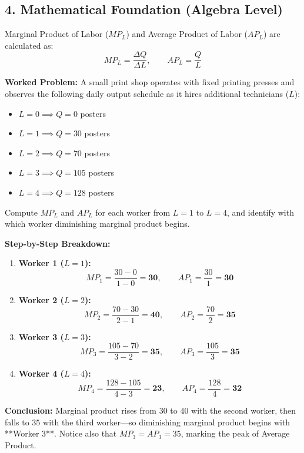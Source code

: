 \documentclass[11pt,letterpaper]{article}
\begin{document}
\subsection*{4. Mathematical Foundation (Algebra Level)}
Marginal Product of Labor ($MP_L$) and Average Product of Labor ($AP_L$) are calculated as:
\begin{equation}
MP_L = \frac{\Delta Q}{\Delta L}, \qquad AP_L = \frac{Q}{L}
\end{equation}

\noindent\textbf{Worked Problem:}
A small print shop operates with fixed printing presses and observes the following daily output schedule as it hires additional technicians ($L$):
\begin{itemize}
    \item $L = 0 \implies Q = 0$ posters
    \item $L = 1 \implies Q = 30$ posters
    \item $L = 2 \implies Q = 70$ posters
    \item $L = 3 \implies Q = 105$ posters
    \item $L = 4 \implies Q = 128$ posters
\end{itemize}
Compute $MP_L$ and $AP_L$ for each worker from $L = 1$ to $L = 4$, and identify with which worker diminishing marginal product begins.

\noindent\textbf{Step-by-Step Breakdown:}
\begin{enumerate}
    \item \textbf{Worker 1 ($L = 1$):}
    \[
    MP_1 = \frac{30 - 0}{1 - 0} = \mathbf{30}, \qquad AP_1 = \frac{30}{1} = \mathbf{30}
    \]

    \item \textbf{Worker 2 ($L = 2$):}
    \[
    MP_2 = \frac{70 - 30}{2 - 1} = \mathbf{40}, \qquad AP_2 = \frac{70}{2} = \mathbf{35}
    \]

    \item \textbf{Worker 3 ($L = 3$):}
    \[
    MP_3 = \frac{105 - 70}{3 - 2} = \mathbf{35}, \qquad AP_3 = \frac{105}{3} = \mathbf{35}
    \]

    \item \textbf{Worker 4 ($L = 4$):}
    \[
    MP_4 = \frac{128 - 105}{4 - 3} = \mathbf{23}, \qquad AP_4 = \frac{128}{4} = \mathbf{32}
    \]
\end{enumerate}
\textbf{Conclusion:} Marginal product rises from $30$ to $40$ with the second worker, then falls to $35$ with the third worker—so diminishing marginal product begins with **Worker 3**. Notice also that $MP_3 = AP_3 = 35$, marking the peak of Average Product.
\end{document}
